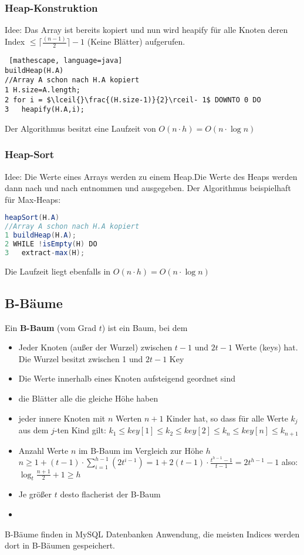 \documentclass[jou,apacite]{apa6}
\begin{document}
\subsubsection{Heap-Konstruktion}
Idee: Das Array ist bereits kopiert und nun wird heapify für alle Knoten deren Index $\leq \lceil{}\frac{(n-1)}{2}\rceil-1$ (Keine Blätter) aufgerufen.
\begin{lstlisting} [mathescape, language=java]
buildHeap(H.A) 
//Array A schon nach H.A kopiert
1 H.size=A.length;
2 for i = $\lceil{}\frac{(H.size-1)}{2}\rceil- 1$ DOWNTO 0 DO
3   heapify(H.A,i);
\end{lstlisting}
Der Algorithmus besitzt eine Laufzeit von $O(n \cdot h) = O(n \cdot \log n)$
\subsubsection{Heap-Sort}
Idee: Die Werte eines Arrays werden zu einem Heap.Die Werte des Heaps werden dann nach und nach entnommen und ausgegeben.
Der Algorithmus beispielhaft für Max-Heaps:
\begin{lstlisting}[language=java]
heapSort(H.A) 
//Array A schon nach H.A kopiert
1 buildHeap(H.A);
2 WHILE !isEmpty(H) DO 
3   extract-max(H);
\end{lstlisting}
Die Laufzeit liegt ebenfalls in $O(n\cdot h)= O(n\cdot\log n)$

\subsection{B-Bäume}
Ein {\bfseries B-Baum} (vom Grad $t$) ist ein Baum, bei dem
\begin{itemize}
    \item Jeder Knoten (außer der Wurzel) zwischen $t-1$ und $2t-1$ Werte (keys) hat. Die Wurzel besitzt zwischen 1 und $2t-1$ Key
    \item Die Werte innerhalb eines Knoten aufsteigend geordnet sind
    \item die Blätter alle die gleiche Höhe haben
    \item jeder innere Knoten mit $n$ Werten $n+1$ Kinder hat, so dass für alle Werte $k_j$ aus dem $j$-ten Kind gilt: $k_1 \leq key[1] \leq k_2 \leq key[2] \leq k_n \leq key[n] \leq k_{n+1}$
    \item Anzahl Werte $n$ im B-Baum im Vergleich zur Höhe $h$ $n \geq 1 + (t-1) \cdot \sum_{i=1}^{h-1}(2t^{i-1}) = 1+ 2(t-1)\cdot \frac{t^{h-1}-1}{t-1} = 2t^{h-1}-1$ also: $\log_{t}\frac{n+1}{2} + 1 \geq h$
    \item Je größer $t$ desto \dq flacher\dq ist der B-Baum
    \item 
\end{itemize}
B-Bäume finden in MySQL Datenbanken Anwendung, die meisten Indices werden dort in B-Bäumen gespeichert.
\end{document}
